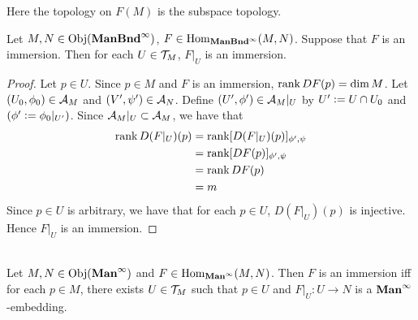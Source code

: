 \documentclass{book}
\begin{document}
	\begin{note}
	Here the topology on $F(M)$ is the subspace topology.
	\end{note}

	\begin{ex} 
		Let $M,N \in \operatorname{Obj}(\operatorname*{\text{\textbf{ManBnd}}^{\infty}})$, $F \in \operatorname{Hom}_{\operatorname*{\text{\textbf{ManBnd}}^{\infty}}}(M,N)$. Suppose that $F$ is an immersion. Then for each $U \in \mathcal{T}_M$, $F|_U$ is an immersion. 
	\end{ex}

	\begin{proof}
		Let $p \in U$. Since $p \in M$ and $F$ is an immersion, $\operatorname{\text{rank}} DF(p) = \dim M$. Let $(U_0, \phi_0) \in \mathcal{A}_M$ and $(V', \psi') \in \mathcal{A}_N$. Define $(U', \phi') \in \mathcal{A}_M|_U$ by $U' \vcentcolon= U \cap U_0$ and $(\phi' \vcentcolon= \phi_0|_{U'})$. Since $\mathcal{A}_M|_U \subset \mathcal{A}_M$, we have that
		\begin{align*}
			\operatorname{\text{rank}} D(F|_U)(p)
			& = \operatorname{\text{rank}} [D(F|_U)(p)]_{\phi', \psi} \\
			& = \operatorname{\text{rank}} [DF(p)]_{\phi', \psi} \\
			& = \operatorname{\text{rank}} DF(p) \\
			& = m
		\end{align*}
		Since $p \in U$ is arbitrary, we have that for each $p \in U$, $D(F|_U)(p)$ is injective. Hence $F|_U$ is an immersion.  
	\end{proof}

	\begin{ex}   \\
		Let $M, N \in \operatorname{Obj}(\operatorname*{\text{\textbf{Man}}^{\infty}})$ and $F \in \operatorname{Hom}_{\operatorname*{\text{\textbf{Man}}^{\infty}}}(M, N)$. Then $F$ is an immersion iff for each $p \in M$, there exists $U \in \mathcal{T}_M$ such that $p \in U$ and $F|_U:U \rightarrow N$ is a $\operatorname*{\text{\textbf{Man}}^{\infty}}$-embedding. 
	\end{ex}
\end{document}
